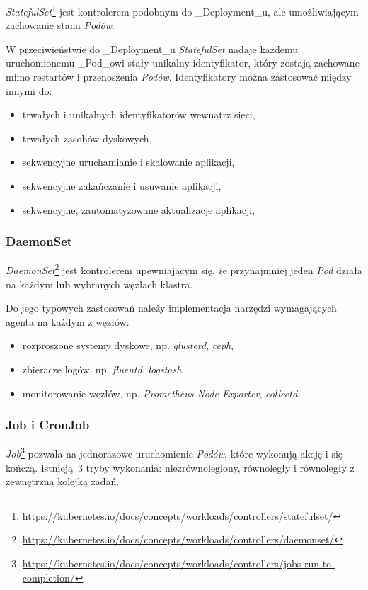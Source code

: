 \documentclass[a4paper,12pt,twoside,openany]{report}
\providecommand{\tightlist}{%
  \setlength{\itemsep}{0pt}\setlength{\parskip}{0pt}}
\DeclareRobustCommand{\href}[2]{#2\footnote{\url{#1}}}
\begin{document}
\href{https://kubernetes.io/docs/concepts/workloads/controllers/statefulset/}{\emph{StatefulSet}}
jest kontrolerem podobnym do \_Deployment\_u, ale umożliwiającym
zachowanie stanu \emph{Podów}.

W przeciwieństwie do \_Deployment\_u \emph{StatefulSet} nadaje każdemu
uruchomionemu \_Pod\_owi stały unikalny identyfikator, który zostają
zachowane mimo restartów i przenoszenia \emph{Podów}. Identyfikatory
można zastosować między innymi do:

\begin{itemize}
\tightlist
\item
  trwałych i unikalnych identyfikatorów wewnątrz sieci,
\item
  trwałych zasobów dyskowych,
\item
  sekwencyjne uruchamianie i skalowanie aplikacji,
\item
  sekwencyjne zakańczanie i usuwanie aplikacji,
\item
  sekwencyjne, zautomatyzowane aktualizacje aplikacji,
\end{itemize}

\hypertarget{daemonset}{%
\subsubsection{DaemonSet}\label{daemonset}}

\href{https://kubernetes.io/docs/concepts/workloads/controllers/daemonset/}{\emph{DaemonSet}}
jest kontrolerem upewniającym się, że przynajmniej jeden \emph{Pod}
działa na każdym lub wybranych węzłach klastra.

Do jego typowych zastosowań należy implementacja narzędzi wymagających
agenta na każdym z węzłów:

\begin{itemize}
\tightlist
\item
  rozproszone systemy dyskowe, np. \emph{glusterd}, \emph{ceph},
\item
  zbieracze logów, np. \emph{fluentd}, \emph{logstash},
\item
  monitorowanie węzłów, np. \emph{Prometheus Node Exporter},
  \emph{collectd},
\end{itemize}

\hypertarget{job-i-cronjob}{%
\subsubsection{Job i CronJob}\label{job-i-cronjob}}

\href{https://kubernetes.io/docs/concepts/workloads/controllers/jobs-run-to-completion/}{\emph{Job}}
pozwala na jednorazowe uruchomienie \emph{Podów}, które wykonują akcję i
się kończą. Istnieją~3 tryby wykonania: niezrównoleglony, równoległy i
równoległy z zewnętrzną kolejką zadań.
\end{document}
